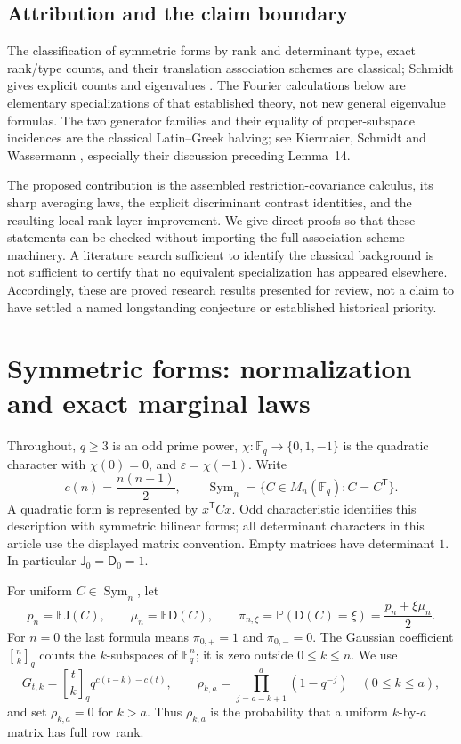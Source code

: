 \documentclass[11pt,a4paper]{article}
\theoremstyle{definition}
\theoremstyle{remark}
\newcommand{\F}{\mathbb F}
\newcommand{\E}{\mathbb E}
\newcommand{\Pp}{\mathbb P}
\newcommand{\Sym}{\operatorname{Sym}}
\newcommand{\eps}{\varepsilon}
\newcommand{\J}{\mathsf J}
\newcommand{\D}{\mathsf D}
\newcommand{\gb}[2]{\genfrac{[}{]}{0pt}{}{#1}{#2}_{q}}
\begin{document}
\subsection{Attribution and the claim boundary}
The classification of symmetric forms by rank and determinant type, exact
rank/type counts, and their translation association schemes are classical;
Schmidt gives explicit counts and eigenvalues \cite{schmidt2015,schmidt2020}.
The Fourier calculations below are elementary specializations of that
established theory, not new general eigenvalue formulas. The two generator
families and their equality of proper-subspace incidences are the classical
Latin--Greek halving; see Kiermaier, Schmidt and Wassermann
\cite{polar-designs}, especially their discussion preceding Lemma~14.

The proposed contribution is the assembled restriction-covariance calculus,
its sharp averaging laws, the explicit discriminant contrast identities,
and the resulting local rank-layer improvement. We give direct proofs so
that these statements can be checked without importing the full association
scheme machinery. A literature search sufficient to identify the classical
background is not sufficient to certify that no equivalent specialization
has appeared elsewhere. Accordingly, these are proved research results
presented for review, not a claim to have settled a named longstanding
conjecture or established historical priority.

\section{Symmetric forms: normalization and exact marginal laws}
\label{sec:counts}
Throughout, $q\ge3$ is an odd prime power, $\chi:\F_q\to\{0,1,-1\}$ is the
quadratic character with $\chi(0)=0$, and $\eps=\chi(-1)$. Write
\[
 c(n)=\frac{n(n+1)}2,\qquad \Sym_n=\{C\in M_n(\F_q):C=C^{\mathsf T}\}.
\]
A quadratic form is represented by $x^{\mathsf T}Cx$. Odd characteristic
identifies this description with symmetric bilinear forms; all determinant
characters in this article use the displayed matrix convention. Empty
matrices have determinant $1$. In particular $\J_0=\D_0=1$.

For uniform $C\in\Sym_n$, let
\begin{equation}\label{eq:marginal-defs}
 p_n=\E\J(C),\qquad \mu_n=\E\D(C),\qquad
 \pi_{n,\xi}=\Pp(\D(C)=\xi)=\frac{p_n+\xi\mu_n}{2}.
\end{equation}
For $n=0$ the last formula means $\pi_{0,+}=1$ and $\pi_{0,-}=0$.
The Gaussian coefficient $\gb nk$ counts the $k$-subspaces of $\F_q^n$;
it is zero outside $0\le k\le n$. We use
\begin{equation}\label{eq:G-rho}
 G_{t,k}=\gb tk q^{c(t-k)-c(t)},\qquad
 \rho_{k,a}=\prod_{j=a-k+1}^{a}(1-q^{-j})\quad(0\le k\le a),
\end{equation}
and set $\rho_{k,a}=0$ for $k>a$. Thus $\rho_{k,a}$ is the probability that
a uniform $k$-by-$a$ matrix has full row rank.
\end{document}

